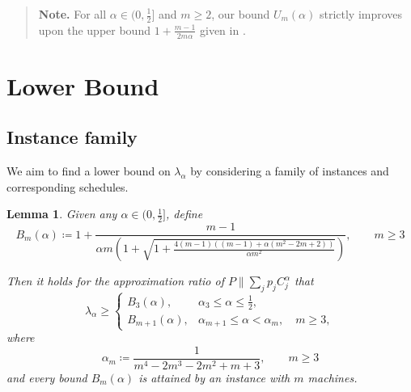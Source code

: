 \documentclass[%
english, titlepage=false %
]{./tum-templates/book/tumbook}
\newtheorem{lemma}{Lemma}
\newcommand{\Problem}{P\!\parallel\!\sum_j p_j C^{\alpha}_j}
\begin{document}
\begin{quote}
    \small\normalfont
    \textbf{Note.}
    For all $\alpha \in (0,\frac12]$ and $m\ge2$, our bound $U_m(\alpha)$
    strictly improves upon the upper bound $1+\frac{m-1}{2m\alpha}$
    given in \cite{JaegerSkutella2018}.
\end{quote}


\newpage
\section{Lower Bound}\label{sec:lower-bound}

\subsection*{Instance family}

We aim to find a lower bound on $\lambda_{\alpha}$ by considering a family of instances and corresponding schedules. 
\begin{lemma}\label{lem: LB}
Given any $\alpha \in \Big(0,\frac12\Big]$,
define 
\[
B_m(\alpha)
\coloneqq
1+
\frac{m-1}{
\alpha m\left(
1+\sqrt{
1+
\frac{
4(m-1)\left((m-1)+\alpha(m^2-2m+2)\right)
}{\alpha m^2}
}
\right)}, \qquad m \ge 3
\]

Then it holds for the approximation ratio of $\Problem$ that
\[
\boxed{
\lambda_{\alpha}\ge 
\begin{cases}
B_3(\alpha),
& \displaystyle \alpha_3\leq\alpha\leq\frac12,\\[6pt]
B_{m+1}(\alpha),
& \alpha_{m+1}\leq\alpha<\alpha_{m},\quad m\geq 3,
\end{cases}
}
\]
where 
\[
\alpha_m \coloneqq \frac{1}{m^4-2m^3-2m^2+m+3}, \qquad m \geq 3
\]
and every bound \(B_m(\alpha)\) is attained by an instance with \(m\) machines.
\end{lemma}
\end{document}

